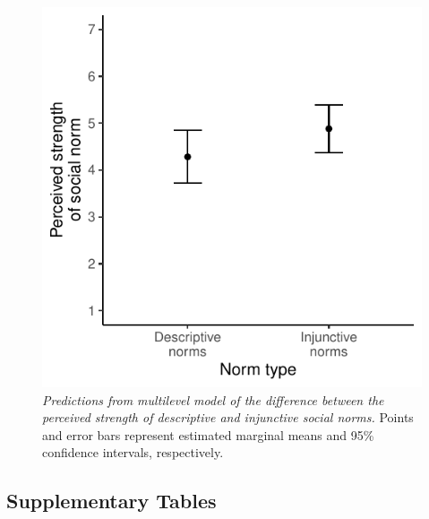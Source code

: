\documentclass[
  english,
  man,floatsintext]{apa6}
\begin{document}
\newpage



\begin{figure}
\centering
\includegraphics{manuscript_files/figure-latex/plotNormCompare-1.pdf}
\caption{\label{fig:plotNormCompare}\emph{Predictions from multilevel model of the difference between the perceived strength of descriptive and injunctive social norms.} Points and error bars represent estimated marginal means and 95\% confidence intervals, respectively.}
\end{figure}

\newpage

\hypertarget{supplementary-tables}{%
\subsection{Supplementary Tables}\label{supplementary-tables}}
\end{document}
